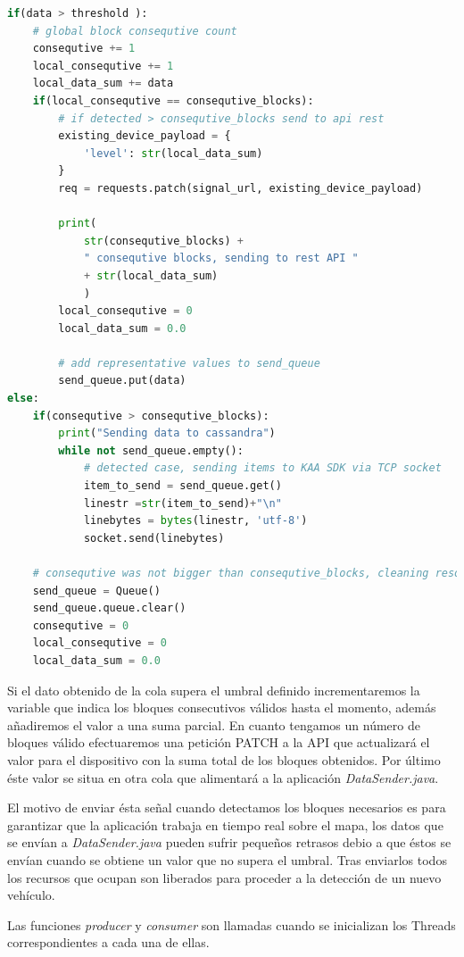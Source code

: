 \begin{lstlisting}[language=python,caption={Hebra consumidora},label={lst:pi1}]
if(data > threshold ):
	# global block consequtive count
	consequtive += 1
	local_consequtive += 1
	local_data_sum += data
	if(local_consequtive == consequtive_blocks):
		# if detected > consequtive_blocks send to api rest
		existing_device_payload = {
			'level': str(local_data_sum)
		}
		req = requests.patch(signal_url, existing_device_payload)

		print(
			str(consequtive_blocks) +
			" consequtive blocks, sending to rest API "
			+ str(local_data_sum)
			)
		local_consequtive = 0
		local_data_sum = 0.0

		# add representative values to send_queue
		send_queue.put(data)
else:
	if(consequtive > consequtive_blocks):
		print("Sending data to cassandra")
		while not send_queue.empty():
			# detected case, sending items to KAA SDK via TCP socket
			item_to_send = send_queue.get()
			linestr =str(item_to_send)+"\n"
			linebytes = bytes(linestr, 'utf-8')
			socket.send(linebytes)

	# consequtive was not bigger than consequtive_blocks, cleaning resources
	send_queue = Queue()
	send_queue.queue.clear()
	consequtive = 0
	local_consequtive = 0
	local_data_sum = 0.0
\end{lstlisting}

Si el dato obtenido de la cola supera el umbral definido incrementaremos la variable que indica los bloques consecutivos válidos hasta el momento, además añadiremos el valor a una suma parcial. En cuanto tengamos un número de bloques válido efectuaremos una petición PATCH a la API que actualizará el valor para el dispositivo con la suma total de los bloques obtenidos. Por último éste valor se situa en otra cola que alimentará a la aplicación \textit{DataSender.java}.

El motivo de enviar ésta señal cuando detectamos los bloques necesarios es para garantizar que la aplicación trabaja en tiempo real sobre el mapa, los datos que se envían a \textit{DataSender.java} pueden sufrir pequeños retrasos debio a que éstos se envían cuando se obtiene un valor que no supera el umbral. Tras enviarlos todos los recursos que ocupan son liberados para proceder a la detección de un nuevo vehículo.

\newpage

Las funciones \textit{producer} y \textit{consumer} son llamadas cuando se inicializan los Threads correspondientes a cada una de ellas.

